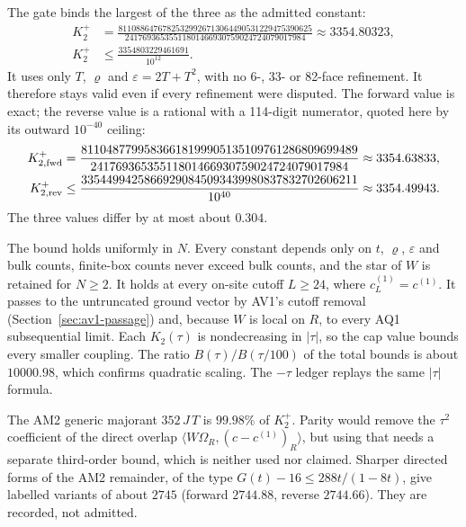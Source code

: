 The gate binds the largest of the three as the admitted constant:
\begin{equation}
 \begin{aligned}
 K_2^+&=\frac{81108864767825329926713064490531229475390625}{24176936535511801466930759024724079017984}
 \approx3354.80323,\\
 K_2^+&\le\frac{3354803229461691}{10^{12}} .
 \end{aligned}
 \label{eq:aw1-K2}
\end{equation}
It uses only $T$, $\varrho$ and $\varepsilon=2T+T^2$, with no 6-, 33- or
82-face refinement. It therefore stays valid even if every refinement were
disputed. The forward value is exact; the reverse value is a rational with a
114-digit numerator, quoted here by its outward $10^{-40}$ ceiling:
\begin{equation}
 \begin{aligned}
 K_{2,\rm fwd}^+&=\frac{81104877995836618199905135109761286809699489}{24176936535511801466930759024724079017984}
 \approx3354.63833,\\
 K_{2,\rm rev}^+&\le\frac{33544994258669290845093439980837832702606211}{10^{40}}
 \approx3354.49943 .
 \end{aligned}
 \label{eq:aw1-K2-producers}
\end{equation}
The three values differ by at most about $0.304$.

The bound holds uniformly in $N$. Every constant depends only on $t$,
$\varrho$, $\varepsilon$ and bulk counts, finite-box counts never exceed
bulk counts, and the star of $W$ is retained for $N\ge2$. It holds at every
on-site cutoff $L\ge24$, where $c^{(1)}_L=c^{(1)}$. It passes to the
untruncated ground vector by AV1's cutoff removal
(Section~\ref{sec:av1-passage}) and, because $W$ is local on $R$, to every
AQ1 subsequential limit. Each $K_2(\tau)$ is nondecreasing in $|\tau|$, so
the cap value bounds every smaller coupling. The ratio $B(\tau)/B(\tau/100)$
of the total bounds is about $10000.98$, which confirms quadratic scaling. The
$-\tau$ ledger replays the same $|\tau|$ formula.

The AM2 generic majorant $352\,J\,T$ is $99.98\%$ of $K_2^+$. Parity would
remove the $\tau^2$ coefficient of the direct overlap
$\langle W\Omega_R,(c-c^{(1)})_R\rangle$, but using that needs a separate
third-order bound, which is neither used nor claimed. Sharper directed forms
of the AM2 remainder, of the type $G(t)-16\le288t/(1-8t)$, give labelled
variants of about $2745$ (forward $2744.88$, reverse $2744.66$). They are
recorded, not admitted.

